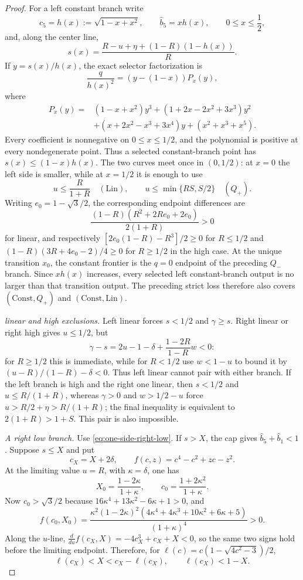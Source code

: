 \begin{proof}
For a left constant branch write
\[
 c_5=h(x):=\sqrt{1-x+x^2},\qquad
 \widehat b_5=xh(x),\qquad 0\le x\le\frac12,
\]
and, along the center line,
\[
 s(x)=\frac{R-u+\eta+(1-R)(1-h(x))}{R}.
\]
If $y=s(x)/h(x)$, the exact selector factorization is
\[
 \frac{q}{h(x)^2}=(y-(1-x))P_x(y),
\]
where
\begin{align*}
 P_x(y)={}&(1-x+x^2)y^3+(1+2x-2x^2+3x^3)y^2\\
 &+(x+2x^2-x^3+3x^4)y+(x^2+x^3+x^5).
\end{align*}
Every coefficient is nonnegative on $0\le x\le1/2$, and the polynomial is
positive at every nondegenerate point.  Thus a selected constant-branch point has
$s(x)\le(1-x)h(x)$.  The two curves meet once in $(0,1/2)$: at $x=0$ the
left side is smaller, while at $x=1/2$ it is enough to use
\[
 u\le\frac{R}{1+R}\quad(\mathrm{Lin}),\qquad
 u\le\min\{RS,S/2\}\quad(Q_+).
\]
Writing $e_0=1-\sqrt3/2$, the corresponding endpoint differences are
\[
 \frac{(1-R)(R^2+2Re_0+2e_0)}{2(1+R)}>0
\]
for linear, and respectively
$[2e_0(1-R)-R^3]/2\ge0$ for $R\le1/2$ and
$(1-R)(3R+4e_0-2)/4\ge0$ for $R\ge1/2$ in the high case.
At the unique transition $x_0$, the constant frontier is the $q=0$ endpoint of
the preceding $Q_-$ branch.  Since $xh(x)$ increases, every selected left constant-branch output is no larger than that transition output.  The preceding strict
loss therefore also covers $(\mathrm{Const},Q_+)$ and $(\mathrm{Const},\mathrm{Lin})$.

\smallskip\noindent
\emph{linear and high exclusions.}
Left linear forces $s<1/2$ and $\gamma\ge s$.  Right linear or right high gives
$u\le1/2$, but
\[
 \gamma-s=2u-1-\delta+\frac{1-2R}{1-R}w<0:
\]
for $R\ge1/2$ this is immediate, while for $R<1/2$ use $w<1-u$ to bound it
by $(u-R)/(1-R)-\delta<0$.  Thus left linear cannot pair with either branch.
If the left branch is high and the right one linear, then $s<1/2$ and
$u\le R/(1+R)$, whereas $\gamma>0$ and $w>1/2-u$ force
$u>R/2+\eta>R/(1+R)$; the final inequality is equivalent to
$2(1+R)>1+S$.  This pair is also impossible.

\smallskip\noindent
\emph{A right low branch.}
Use \eqref{eq:one-side-right-low}.  If $s>X$, the cap gives
$\widehat b_5+\widehat b_1<1$.  Suppose $s\le X$ and put
\[
 c_X=X+2\delta,\qquad f(c,z)=c^4-c^2+zc-z^2.
\]
At the limiting value $u=R$, with $\kappa=\delta$, one has
\[
 X_0=\frac{1-2\kappa}{1+\kappa},\qquad
 c_0=\frac{1+2\kappa^2}{1+\kappa}.
\]
Now $c_0>\sqrt3/2$ because
$16\kappa^4+13\kappa^2-6\kappa+1>0$, and
\[
 f(c_0,X_0)=
 \frac{\kappa^2(1-2\kappa)^2
 (4\kappa^4+4\kappa^3+10\kappa^2+6\kappa+5)}{(1+\kappa)^4}>0.
\]
Along the $u$-line,
$\frac d{du}f(c_X,X)=-4c_X^3+c_X+X<0$, so the same two signs hold before
the limiting endpoint.  Therefore, for
$\ell(c)=c(1-\sqrt{4c^2-3})/2$,
\[
 \ell(c_X)<X<c_X-\ell(c_X),\qquad \ell(c_X)<1-X.
\]


\end{proof}
